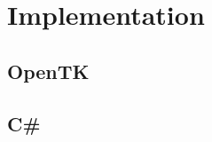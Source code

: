 \chapter{Implementation}
\label{cha:implementation}



\section{OpenTK} %
\label{sec:opentk}



\section{C#} %
\label{sec:c}
